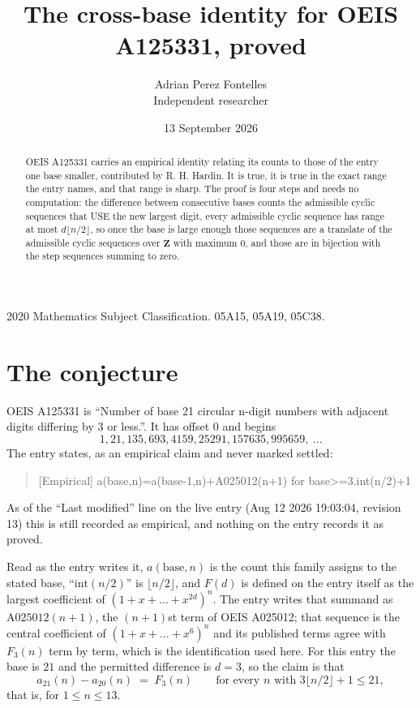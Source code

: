 \documentclass[11pt,a4paper]{article}
\title{The cross-base identity for OEIS A125331, proved}
\author{Adrian Perez Fontelles\\ \small Independent researcher}
\date{13 September 2026}
\theoremstyle{plain}
\theoremstyle{definition}
\begin{document}
\maketitle

\begin{abstract}
OEIS A125331 carries an empirical identity relating its counts to those of the entry one base
smaller, contributed by R. H. Hardin. It is true, it is true in the exact range the entry
names, and that range is sharp. The proof is four steps and needs no computation: the
difference between consecutive bases counts the admissible cyclic sequences that USE the new
largest digit, every admissible cyclic sequence has range at most $d\lfloor n/2\rfloor$, so
once the base is large enough those sequences are a translate of the admissible cyclic
sequences over $\mathbf{Z}$ with maximum $0$, and those are in bijection with the step
sequences summing to zero.
\end{abstract}

\noindent\small 2020 Mathematics Subject Classification. 05A15, 05A19, 05C38.\normalsize

\section{The conjecture}

OEIS A125331 is ``Number of base 21 circular n-digit numbers with adjacent digits differing by 3 or less.''. It has offset $0$ and begins
\[
1, 21, 135, 693, 4159, 25291, 157635, 995659,\ \dots
\]
The entry states, as an empirical claim and never marked settled:
\begin{quote}
[Empirical] a(base,n)=a(base-1,n)+A025012(n+1) for base>=3.int(n/2)+1
\end{quote}
As of the ``Last modified'' line on the live entry (Aug 12 2026 19:03:04, revision 13)
this is still recorded as empirical, and nothing on the entry records it as proved.

Read as the entry writes it, $a(\mathrm{base},n)$ is the count this family assigns to the
stated base, ``$\mathrm{int}(n/2)$'' is $\lfloor n/2\rfloor$, and $F(d)$ is defined on the
entry itself as the largest coefficient of $(1+x+\dots+x^{2d})^{n}$. The entry writes that summand as $\mathrm{A025012}(n+1)$, the $(n+1)$st term of OEIS A025012; that sequence is the central coefficient of $(1+x+\dots+x^{6})^{n}$ and its published terms agree with $F_{3}(n)$ term by term, which is the identification used here. For this entry
the base is $21$ and the permitted difference is $d=3$, so the claim is that
\[
a_{21}(n)-a_{20}(n)\;=\;F_{3}(n)
\qquad\text{for every } n \text{ with } 3\lfloor n/2\rfloor+1\le21,
\]
that is, for $1\le n\le13$.
\end{document}
